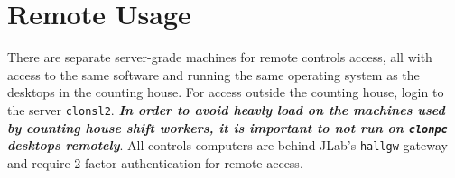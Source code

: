 \documentclass[amsmath,amssymb,notitlepage,11pt]{revtex4}
\begin{document}
\section{Remote Usage}\label{sec:remote}
There are separate server-grade machines for remote controls access, all with access to the same software and running the same operating system as the desktops in the counting house.  For access outside the counting house, login to the server \texttt{clonsl2}.  {\bf\em In order to avoid heavly load on the machines used by counting house shift workers, it is important to not run on \texttt{clonpc} desktops remotely}.  All controls computers are behind JLab's \texttt{hallgw} gateway and require 2-factor authentication for remote access.  


%
\end{document}
